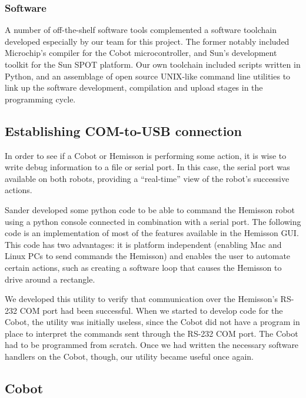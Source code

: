 \documentclass[a4paper,10pt]{article} %
\begin{document}
\subsubsection{Software}

A number of off-the-shelf software tools complemented a software toolchain
developed especially by our team for this project. The former notably included
Microchip's compiler for the Cobot microcontroller, and Sun's development toolkit
for the Sun SPOT platform. Our own toolchain included scripts written in Python,
and an assemblage of open source UNIX-like command line utilities to link up the
software development, compilation and upload stages in the programming cycle.


\subsection{Establishing COM-to-USB connection} %
\label{sub:Establishing COM-to-USB connection}

In order to see if a Cobot or Hemisson is performing some action, it is wise to
write debug information to a file or serial port. In this case, the serial port
was available on both robots, providing a ``real-time'' view of the
robot's successive actions.

Sander developed some python code to be able to command the Hemisson robot using
a python console connected in combination with a serial port. The following code
is an implementation of most of the features available in the Hemisson GUI.
This code has two advantages: it is platform independent (enabling Mac and Linux
PCs to send commands the Hemisson) and enables the user to automate certain
actions, such as creating a software loop that causes the Hemisson to drive
around a rectangle.



\noindent We developed this utility to verify that communication over the
Hemisson's RS-232 COM port had been successful. When we started to develop code for the Cobot, the utility was initially useless, since the Cobot did not have a program in place to interpret the commands sent through the RS-232 COM port. The Cobot had to be programmed from scratch. Once we had written the necessary software handlers on the Cobot, though, our utility became useful once again.


\subsection{Cobot} %
\end{document}
